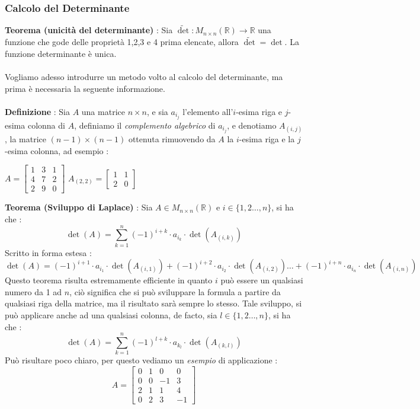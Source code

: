 \documentclass[12pt, letterpaper]{article}
\newcommand{\R}{{\mathbb R}}
\newcommand{\acc}{\\\hphantom{}\\}
\begin{document}
\subsubsection{Calcolo del Determinante}
\textbf{Teorema (unicità del determinante)} : Sia \(\tilde\det:M_{n\times n}(\R)\rightarrow \R\) una funzione che gode delle 
proprietà 1,2,3 e 4 prima elencate, allora \(\tilde \det =\det \). La funzione determinante è unica.\acc
Vogliamo adesso introdurre un metodo volto al calcolo del determinante, ma prima è necessaria la seguente informazione.\acc 
\textbf{Definizione }: Sia \(A\) una matrice \(n\times n\), e sia \(a_{i_j}\) l'elemento all'\(i\)-esima riga e \(j\)-esima 
colonna di \(A\), definiamo il \textit{complemento algebrico} di \(a_{i_j}\), e denotiamo \(A_{(i,j)}\),
 la matrice \((n-1)\times(n-1)\) ottenuta 
rimuovendo da \(A\) la \(i\)-esima riga e la \(j\)-esima colonna, ad esempio :
\begin{center}
    \(A=\begin{bmatrix}
        1&3&1\\4&7&2\\2&9&0
    \end{bmatrix}\)\hphantom{aaaaa} \(A_{(2,2)}=\begin{bmatrix}
        1&1\\2&0
    \end{bmatrix}\)
\end{center}
\textbf{Teorema (Sviluppo di Laplace)} : Sia \(A\in M_{n\times n}(\R)\) e \(i\in\{1,2\dots,n\}\), si ha che :
$$
\det(A)=\sum_{k=1}^n(-1)^{i+k}\cdot a_{i_k}\cdot\det(A_{(i,k)})
$$
Scritto in forma estesa : 
$$
\det(A)=(-1)^{i+1}\cdot a_{i_1}\cdot\det(A_{(i,1)})+(-1)^{i+2}\cdot a_{i_2}\cdot\det(A_{(i,2)})
\dots +(-1)^{i+n}\cdot a_{i_n}\cdot\det(A_{(i,n)})
$$
Questo teorema risulta estremamente efficiente in quanto \(i\) può essere un qualsiasi numero da 1 ad \(n\), ciò significa 
che si può sviluppare la formula a partire da qualsiasi riga della matrice, ma il risultato sarà sempre lo stesso. Tale 
sviluppo, si può applicare anche ad una qualsiasi colonna, de facto, sia \(l\in\{1,2\dots,n\}\), si ha che :
$$
\det(A)=\sum_{k=1}^n(-1)^{l+k}\cdot a_{k_l}\cdot\det(A_{(k,l)})
$$
Può risultare poco chiaro, per questo vediamo un \textit{esempio} di applicazione : \begin{equation}
    A=\begin{bmatrix}
        0&1&0&0\\
        0&0&-1&3\\
        2&1&1&4\\
        0&2&3&-1
    \end{bmatrix}
\end{equation}
\end{document}

